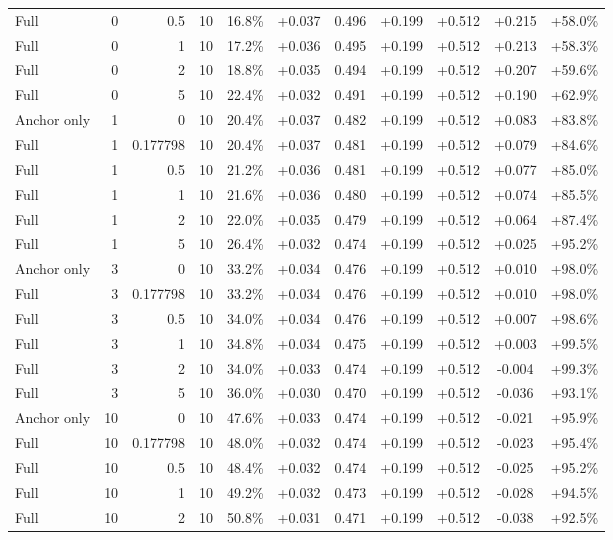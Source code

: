 \begin{table}[htbp]
\begin{tabular}{lrrrccccccc}
Full & 0 & 0.5 & 10 & 16.8\% & +0.037 & 0.496 & +0.199 & +0.512 & +0.215 & +58.0\% \\
Full & 0 & 1 & 10 & 17.2\% & +0.036 & 0.495 & +0.199 & +0.512 & +0.213 & +58.3\% \\
Full & 0 & 2 & 10 & 18.8\% & +0.035 & 0.494 & +0.199 & +0.512 & +0.207 & +59.6\% \\
Full & 0 & 5 & 10 & 22.4\% & +0.032 & 0.491 & +0.199 & +0.512 & +0.190 & +62.9\% \\
Anchor only & 1 & 0 & 10 & 20.4\% & +0.037 & 0.482 & +0.199 & +0.512 & +0.083 & +83.8\% \\
Full & 1 & 0.177798 & 10 & 20.4\% & +0.037 & 0.481 & +0.199 & +0.512 & +0.079 & +84.6\% \\
Full & 1 & 0.5 & 10 & 21.2\% & +0.036 & 0.481 & +0.199 & +0.512 & +0.077 & +85.0\% \\
Full & 1 & 1 & 10 & 21.6\% & +0.036 & 0.480 & +0.199 & +0.512 & +0.074 & +85.5\% \\
Full & 1 & 2 & 10 & 22.0\% & +0.035 & 0.479 & +0.199 & +0.512 & +0.064 & +87.4\% \\
Full & 1 & 5 & 10 & 26.4\% & +0.032 & 0.474 & +0.199 & +0.512 & +0.025 & +95.2\% \\
Anchor only & 3 & 0 & 10 & 33.2\% & +0.034 & 0.476 & +0.199 & +0.512 & +0.010 & +98.0\% \\
Full & 3 & 0.177798 & 10 & 33.2\% & +0.034 & 0.476 & +0.199 & +0.512 & +0.010 & +98.0\% \\
Full & 3 & 0.5 & 10 & 34.0\% & +0.034 & 0.476 & +0.199 & +0.512 & +0.007 & +98.6\% \\
Full & 3 & 1 & 10 & 34.8\% & +0.034 & 0.475 & +0.199 & +0.512 & +0.003 & +99.5\% \\
Full & 3 & 2 & 10 & 34.0\% & +0.033 & 0.474 & +0.199 & +0.512 & -0.004 & +99.3\% \\
Full & 3 & 5 & 10 & 36.0\% & +0.030 & 0.470 & +0.199 & +0.512 & -0.036 & +93.1\% \\
Anchor only & 10 & 0 & 10 & 47.6\% & +0.033 & 0.474 & +0.199 & +0.512 & -0.021 & +95.9\% \\
Full & 10 & 0.177798 & 10 & 48.0\% & +0.032 & 0.474 & +0.199 & +0.512 & -0.023 & +95.4\% \\
Full & 10 & 0.5 & 10 & 48.4\% & +0.032 & 0.474 & +0.199 & +0.512 & -0.025 & +95.2\% \\
Full & 10 & 1 & 10 & 49.2\% & +0.032 & 0.473 & +0.199 & +0.512 & -0.028 & +94.5\% \\
Full & 10 & 2 & 10 & 50.8\% & +0.031 & 0.471 & +0.199 & +0.512 & -0.038 & +92.5\% \\

\end{tabular}
\end{table}

